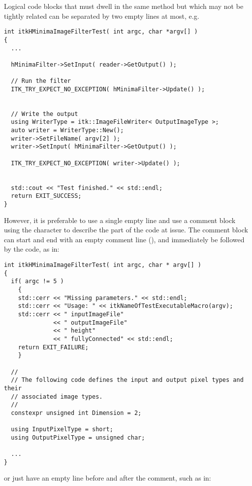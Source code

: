 Logical code blocks that must dwell in the same method but which may not be
tightly related can be separated by two empty lines at most, e.g.

\small
\begin{verbatim}
int itkHMinimaImageFilterTest( int argc, char *argv[] )
{
  ...

  hMinimaFilter->SetInput( reader->GetOutput() );

  // Run the filter
  ITK_TRY_EXPECT_NO_EXCEPTION( hMinimaFilter->Update() );


  // Write the output
  using WriterType = itk::ImageFileWriter< OutputImageType >;
  auto writer = WriterType::New();
  writer->SetFileName( argv[2] );
  writer->SetInput( hMinimaFilter->GetOutput() );

  ITK_TRY_EXPECT_NO_EXCEPTION( writer->Update() );


  std::cout << "Test finished." << std::endl;
  return EXIT_SUCCESS;
}
\end{verbatim}
\normalsize


However, it is preferable to use a single empty line and use a comment block
using the \code{//} character to describe the part of the code at issue. The
comment block can start and end with an empty comment line (\code{//}), and
immediately be followed by the code, as in:

\small
\begin{verbatim}
int itkHMinimaImageFilterTest( int argc, char * argv[] )
{
  if( argc != 5 )
    {
    std::cerr << "Missing parameters." << std::endl;
    std::cerr << "Usage: " << itkNameOfTestExecutableMacro(argv);
    std::cerr << " inputImageFile"
              << " outputImageFile"
              << " height"
              << " fullyConnected" << std::endl;
    return EXIT_FAILURE;
    }

  //
  // The following code defines the input and output pixel types and their
  // associated image types.
  //
  constexpr unsigned int Dimension = 2;

  using InputPixelType = short;
  using OutputPixelType = unsigned char;

  ...
}
\end{verbatim}
\normalsize

or just have an empty line before and after the comment, such as in:

